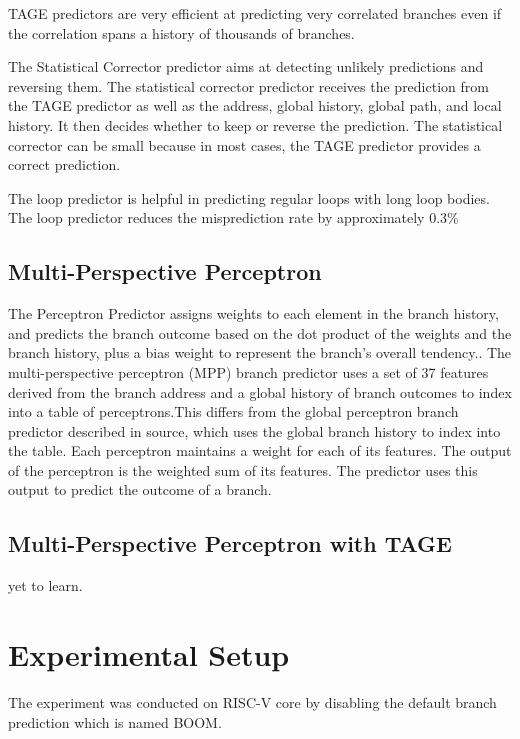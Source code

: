 \documentclass[10pt,journal,compsoc]{IEEEtran}
\begin{document}
TAGE predictors are very efficient at predicting very correlated branches even if the correlation spans a history of thousands of branches.\cite{seznecNewCaseTAGE2011}

The Statistical Corrector predictor aims at detecting unlikely predictions and reversing them.\cite{seznecTAGESCBranchPredictors2014,seznecTAGESCBranchPredictorsAgain2016,seznec64KbytesISLTAGE} The statistical corrector predictor receives the prediction from the TAGE predictor as well as the address, global history, global path, and local history.\cite{seznecTAGESCBranchPredictorsAgain2016} It then decides whether to keep or reverse the prediction. The statistical corrector can be small because in most cases, the TAGE predictor provides a correct prediction.\cite{seznec64KbytesISLTAGE,seznecTAGESCBranchPredictorsAgain2016}

The loop predictor is helpful in predicting regular loops with long loop bodies. The loop predictor reduces the misprediction rate by approximately 0.3\%\cite{seznecTAGESCBranchPredictors2014,seznecTAGESCBranchPredictorsAgain2016}
\subsection{Multi-Perspective Perceptron}
\noindent The Perceptron Predictor assigns weights to each element in the branch history, and predicts the branch outcome based on the dot product of the weights and the branch history, plus a bias weight to represent the branch's overall tendency.\cite{tarjanMergingPathGshare2005}. 
The multi-perspective perceptron (MPP) branch predictor uses a set of 37 features derived from the branch address and a global history of branch outcomes to index into a table of perceptrons.\cite{multi1}This differs from the global perceptron branch predictor described in source, which uses the global branch history to index into the table. Each perceptron maintains a weight for each of its features. The output of the perceptron is the weighted sum of its features. The predictor uses this output to predict the outcome of a branch.
\subsection{Multi-Perspective Perceptron with TAGE}
\noindent
yet to learn. 


\section{Experimental Setup}\label{experimentalSetup}
The experiment was conducted on RISC-V core by disabling the default branch prediction which is named BOOM\cite{BranchPredictionRISCVBOOMa}.
\end{document}
